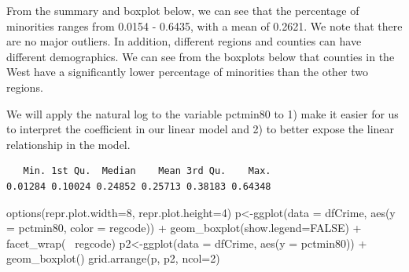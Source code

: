 \documentclass[]{article}
\newenvironment{Shaded}{}{}
\newcommand{\DataTypeTok}[1]{#1}
\newcommand{\DecValTok}[1]{#1}
\newcommand{\KeywordTok}[1]{\textcolor[rgb]{0.00,0.00,1.00}{#1}}
\newcommand{\NormalTok}[1]{#1}
\newcommand{\OperatorTok}[1]{#1}
\newcommand{\OtherTok}[1]{\textcolor[rgb]{1.00,0.25,0.00}{#1}}
\newcommand{\StringTok}[1]{\textcolor[rgb]{0.00,0.50,0.50}{#1}}
\begin{document}
From the summary and boxplot below, we can see that the percentage of
minorities ranges from 0.0154 - 0.6435, with a mean of 0.2621. We note
that there are no major outliers. In addition, different regions and
counties can have different demographics. We can see from the boxplots
below that counties in the West have a significantly lower percentage of
minorities than the other two regions.

We will apply the natural log to the variable pctmin80 to 1) make it
easier for us to interpret the coefficient in our linear model and 2) to
better expose the linear relationship in the model.

\begin{Shaded}
\end{Shaded}

\begin{verbatim}
   Min. 1st Qu.  Median    Mean 3rd Qu.    Max. 
0.01284 0.10024 0.24852 0.25713 0.38183 0.64348 
\end{verbatim}

\begin{Shaded}
\begin{Highlighting}[]
\KeywordTok{options}\NormalTok{(}\DataTypeTok{repr.plot.width=}\DecValTok{8}\NormalTok{, }\DataTypeTok{repr.plot.height=}\DecValTok{4}\NormalTok{)}
\NormalTok{p<-}\KeywordTok{ggplot}\NormalTok{(}\DataTypeTok{data =}\NormalTok{ dfCrime, }\KeywordTok{aes}\NormalTok{(}\DataTypeTok{y =}\NormalTok{ pctmin80, }\DataTypeTok{color =}\NormalTok{ regcode)) }\OperatorTok{+}
\StringTok{     }\KeywordTok{geom_boxplot}\NormalTok{(}\DataTypeTok{show.legend=}\OtherTok{FALSE}\NormalTok{) }\OperatorTok{+}\StringTok{ }\KeywordTok{facet_wrap}\NormalTok{(}\OperatorTok{~}\StringTok{ }\NormalTok{regcode)}
\NormalTok{p2<-}\KeywordTok{ggplot}\NormalTok{(}\DataTypeTok{data =}\NormalTok{ dfCrime, }\KeywordTok{aes}\NormalTok{(}\DataTypeTok{y =}\NormalTok{ pctmin80)) }\OperatorTok{+}
\StringTok{     }\KeywordTok{geom_boxplot}\NormalTok{()}
\KeywordTok{grid.arrange}\NormalTok{(p, p2, }\DataTypeTok{ncol=}\DecValTok{2}\NormalTok{)}
\end{Highlighting}
\end{Shaded}
\end{document}
